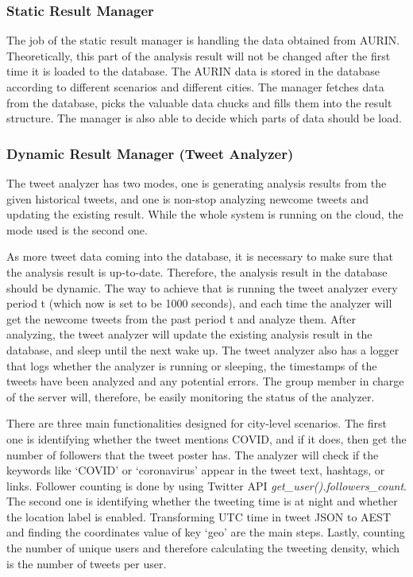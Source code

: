 \documentclass{article}
\begin{document}
\subsubsection{Static Result Manager}
The job of the static result manager is handling the data obtained from AURIN. Theoretically, this part of the analysis result will not be changed after the first time it is loaded to the database. The AURIN data is stored in the database according to different scenarios and different cities. The manager fetches data from the database, picks the valuable data chucks and fills them into the result structure. The manager is also able to decide which parts of data should be load.
\subsubsection{Dynamic Result Manager (Tweet Analyzer)}
The tweet analyzer has two modes, one is generating analysis results from the given historical tweets, and one is non-stop analyzing newcome tweets and updating the existing result. While the whole system is running on the cloud, the mode used is the second one. 

As more tweet data coming into the database, it is necessary to make sure that the analysis result is up-to-date. Therefore, the analysis result in the database should be dynamic. The way to achieve that is running the tweet analyzer every period t (which now is set to be 1000 seconds), and each time the analyzer will get the newcome tweets from the past period t and analyze them. After analyzing, the tweet analyzer will update the existing analysis result in the database, and sleep until the next wake up. The tweet analyzer also has a logger that logs whether the analyzer is running or sleeping, the timestamps of the tweets have been analyzed and any potential errors. The group member in charge of the server will, therefore, be easily monitoring the status of the analyzer.

There are three main functionalities designed for city-level scenarios. The first one is identifying whether the tweet mentions COVID, and if it does, then get the number of followers that the tweet poster has. The analyzer will check if the keywords like ‘COVID’ or ‘coronavirus’ appear in the tweet text, hashtags, or links. Follower counting is done by using Twitter API \textit{get\_user().followers\_count}. The second one is identifying whether the tweeting time is at night and whether the location label is enabled. Transforming UTC time in tweet JSON to AEST and finding the coordinates value of key ‘geo’ are the main steps. Lastly, counting the number of unique users and therefore calculating the tweeting density, which is the number of tweets per user.
\end{document}
